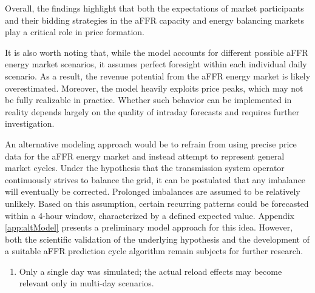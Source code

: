 Overall, the findings highlight that both the expectations of market participants and their bidding strategies in the aFFR capacity and
energy balancing markets play a critical role in price formation.

It is also worth noting that, while the model accounts for different possible aFFR energy market scenarios,
it assumes perfect foresight within each individual daily scenario.
As a result, the revenue potential from the aFFR energy market is likely overestimated.
Moreover, the model heavily exploits price peaks, which may not be fully realizable in practice.
Whether such behavior can be implemented in reality depends largely on the quality of intraday forecasts
and requires further investigation.

An alternative modeling approach would be to refrain from using precise price data for the aFFR energy market
and instead attempt to represent general market cycles.
Under the hypothesis that the transmission system operator continuously strives to balance the grid,
it can be postulated that any imbalance will eventually be corrected.
Prolonged imbalances are assumed to be relatively unlikely.
Based on this assumption, certain recurring patterns could be forecasted within a 4-hour window,
characterized by a defined expected value.
Appendix \ref{app:altModel} presents a preliminary model approach for this idea.
However, both the scientific validation of the underlying hypothesis and the development of a suitable aFFR prediction cycle algorithm
remain subjects for further research.



\begin{enumerate}
	\item Only a single day was simulated; the actual reload effects may become relevant only in multi-day scenarios.
\end{enumerate}


